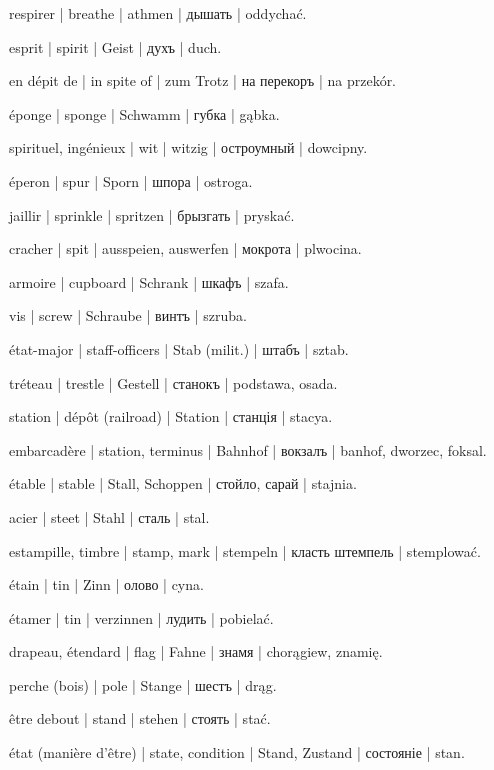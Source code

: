 \begin{outdent}{1em}
respirer | breathe | athmen | дышать | oddychać.

esprit | spirit | Geist | духъ | duch.

en dépit de | in spite of | zum Trotz | на перекоръ | na przekór.

éponge | sponge | Schwamm | губка | gąbka.

spirituel, ingénieux | wit | witzig | остроумный | dowcipny.

éperon | spur | Sporn | шпора | ostroga.

jaillir | sprinkle | spritzen | брызгать | pryskać.

cracher | spit | ausspeien, auswerfen | мокрота | plwocina.

armoire | cupboard | Schrank | шкафъ | szafa.

vis | screw | Schraube | винтъ | szruba.

état-major | staff-officers | Stab (milit.) | штабъ | sztab.

tréteau | trestle | Gestell | станокъ | podstawa, osada.

station | dépôt (railroad) | Station | станція | stacya.

\uvsubentry{}
embarcadère | station, terminus | Bahnhof | вокзалъ | banhof, dworzec, foksal.

étable | stable | Stall, Schoppen | стойло, сарай | stajnia.

acier | steet | Stahl | сталь | stal.

estampille, timbre | stamp, mark | stempeln | класть штемпель | stemplować.

étain | tin | Zinn | олово | cyna.

\uvsubentry{}
étamer | tin | verzinnen | лудить | pobielać.

drapeau, étendard | flag | Fahne | знамя | chorągiew, znamię.

perche (bois) | pole | Stange | шестъ | drąg.

être debout | stand | stehen | стоять | stać.

état (manière d’être) | state, condition | Stand, Zustand | состояніе | stan.


\end{outdent}
